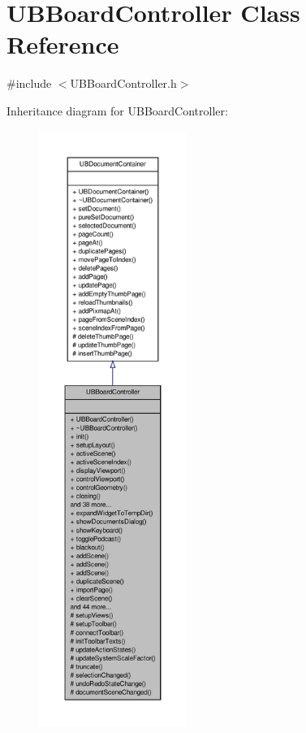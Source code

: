 \hypertarget{class_u_b_board_controller}{\section{U\-B\-Board\-Controller Class Reference}
\label{d7/d62/class_u_b_board_controller}
}


{\ttfamily \#include $<$U\-B\-Board\-Controller.\-h$>$}



Inheritance diagram for U\-B\-Board\-Controller\-:
\nopagebreak
\begin{figure}[H]
\begin{center}
\leavevmode
\includegraphics[height=550pt]{d3/da8/class_u_b_board_controller__inherit__graph}
\end{center}
\end{figure}


